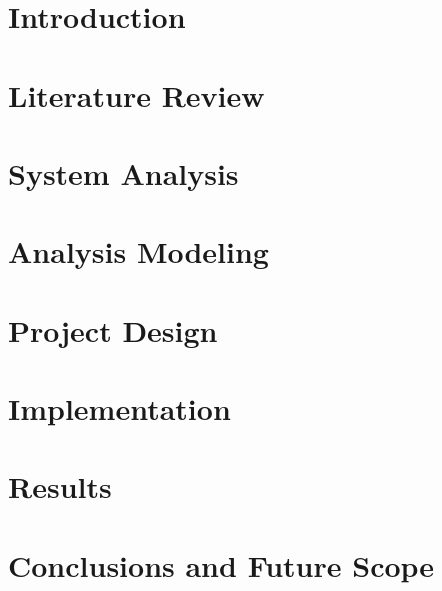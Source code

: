 \documentclass[12pt]{report}
\begin{document}
\renewcommand{\thepage}{\roman{page}}








\setlength{\parskip}{0pt}
\tableofcontents
{}
\listoffigures
{}
\listoftables
{}


\clearpage
\setcounter{page}{1}
\setcounter{chapter}{0}
\renewcommand{\thepage}{\arabic{page}}
\setlength{\parskip}{1em}

\chapter{Introduction}\label{cha:introduction}


\chapter{Literature Review}\label{chap:lit}


\chapter{System Analysis}\label{chap:ana}


\chapter{Analysis Modeling}\label{chap:model}


\chapter{Project Design}\label{cha:design}


\chapter{Implementation}\label{cha:implementation}


\chapter{Results}


\chapter{Conclusions and Future Scope}


\printbibliography






\end{document}
